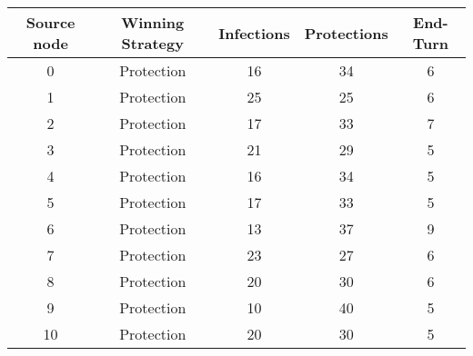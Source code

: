 \documentclass[results.tex]{subfiles}
\begin{document}
    \begin{center}
        \begin{tabular}{| c || c | c | c | c |}
            \hline
            {\bfseries Source node} & {\bfseries Winning Strategy} & {\bfseries Infections} & {\bfseries Protections}
            & {\bfseries End-Turn}
            \\  %
            \hline\hline
            0                       & Protection                   & 16                     & 34                      & 6                    \\
            \hline
            1                       & Protection                   & 25                     & 25                      & 6                    \\
            \hline
            2                       & Protection                   & 17                     & 33                      & 7                    \\
            \hline
            3                       & Protection                   & 21                     & 29                      & 5                    \\
            \hline
            4                       & Protection                   & 16                     & 34                      & 5                    \\
            \hline
            5                       & Protection                   & 17                     & 33                      & 5                    \\
            \hline
            6                       & Protection                   & 13                     & 37                      & 9                    \\
            \hline
            7                       & Protection                   & 23                     & 27                      & 6                    \\
            \hline
            8                       & Protection                   & 20                     & 30                      & 6                    \\
            \hline
            9                       & Protection                   & 10                     & 40                      & 5                    \\
            \hline
            10                      & Protection                   & 20                     & 30                      & 5                    \\

\end{tabular}
\end{center}
\end{document}
